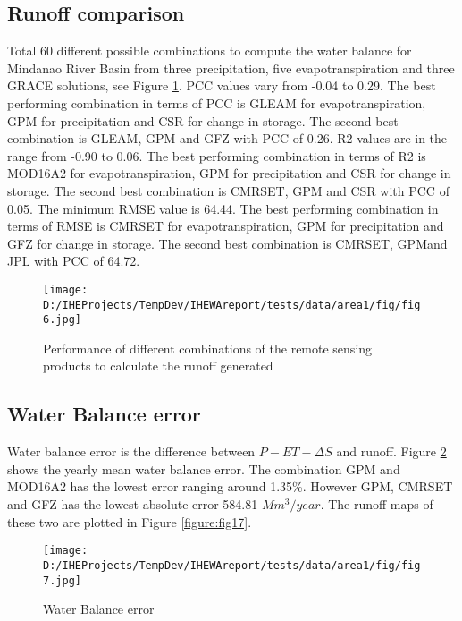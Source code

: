 \documentclass{article}%
\begin{document}
\subsection{Runoff comparison}%
\label{subsec:Runoffcomparison}%
Total 60 different possible combinations to compute the water balance for Mindanao River Basin from three precipitation, five evapotranspiration and three GRACE solutions, see Figure \ref{figure:fig15}.%
\linebreak%
PCC values vary from -0.04 to 0.29. The best performing combination in terms of PCC is GLEAM for evapotranspiration, GPM for precipitation and CSR for change in storage. The second best combination is GLEAM, GPM and GFZ with PCC of 0.26.%
\linebreak%
R2 values are in the range from -0.90 to 0.06. The best performing combination in terms of R2 is MOD16A2 for evapotranspiration, GPM for precipitation and CSR for change in storage. The second best combination is CMRSET, GPM and CSR with PCC of 0.05.%
\linebreak%
The minimum RMSE value is 64.44. The best performing combination in terms of RMSE is CMRSET for evapotranspiration, GPM for precipitation and GFZ for change in storage. The second best combination is CMRSET, GPMand JPL with PCC of 64.72.%
\linebreak%


\begin{figure}[H]%
\centering%
\texttt{[image: D:/IHEProjects/TempDev/IHEWAreport/tests/data/area1/fig/fig6.jpg]}%
\caption{Performance of different combinations of the remote sensing products to calculate the runoff generated}%
\label{figure:fig15}%
\end{figure}

%
\subsection{Water Balance error}%
\label{subsec:WaterBalanceerror}%
Water balance error is the difference between $P-ET-\Delta S$ and runoff. Figure \ref{figure:fig16} shows the yearly mean water balance error. The combination GPM and MOD16A2 has the lowest error ranging around 1.35\%. However GPM, CMRSET and GFZ has the lowest absolute error 584.81 $Mm^3/year$. The runoff maps of these two are plotted in Figure \ref{figure:fig17}.%
\linebreak%


\begin{figure}[H]%
\centering%
\texttt{[image: D:/IHEProjects/TempDev/IHEWAreport/tests/data/area1/fig/fig7.jpg]}%
\caption{Water Balance error}%
\label{figure:fig16}%
\end{figure}
\end{document}
